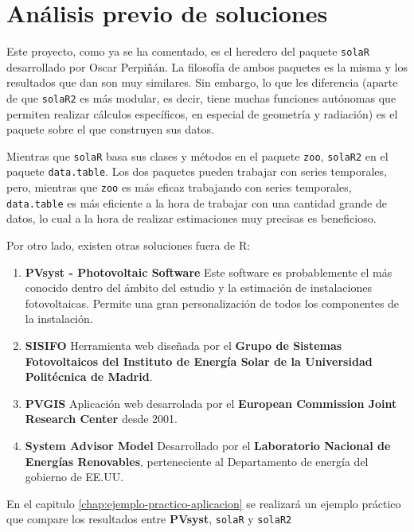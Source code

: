 \section{Análisis previo de soluciones}
\label{sec:org708989f}
Este proyecto, como ya se ha comentado, es el heredero del paquete \texttt{solaR} desarrollado por Oscar Perpiñán. La filosofía de ambos paquetes es la misma y los resultados que dan son muy similares. Sin embargo, lo que les diferencia (aparte de que \texttt{solaR2} es más modular, es decir, tiene muchas funciones autónomas que permiten realizar cálculos específicos, en especial de geometría y radiación) es el paquete sobre el que construyen sus datos.

Mientras que \texttt{solaR} basa sus clases y métodos en el paquete \texttt{zoo}, \texttt{solaR2} en el paquete \texttt{data.table}. Los dos paquetes pueden trabajar con series temporales, pero, mientras que \texttt{zoo} es más eficaz trabajando con series temporales, \texttt{data.table} es más eficiente a la hora de trabajar con una cantidad grande de datos, lo cual a la hora de realizar estimaciones muy precisas es beneficioso.

Por otro lado, existen otras soluciones fuera de R:
\begin{enumerate}
\item \textbf{PVsyst - Photovoltaic Software} \cite{pvsyst}
Este software es probablemente el más conocido dentro del ámbito del estudio y la estimación de instalaciones fotovoltaicas. Permite una gran personalización de todos los componentes de la instalación.
\item \textbf{SISIFO} \cite{sisifo}
Herramienta web diseñada por el \textbf{Grupo de Sistemas Fotovoltaicos del Instituto de Energía Solar de la Universidad Politécnica de Madrid}.
\item \textbf{PVGIS} \cite{pvgis}
Aplicación web desarrolada por el \textbf{European Commission Joint Research Center} desde 2001.
\item \textbf{System Advisor Model} \cite{sam}
Desarrollado por el \textbf{Laboratorio Nacional de Energías Renovables}, perteneciente al Departamento de energía del gobierno de EE.UU.
\end{enumerate}
En el capitulo \ref{chap:ejemplo-practico-aplicacion} se realizará un ejemplo práctico que compare los resultados entre \textbf{PVsyst}, \texttt{solaR} y \texttt{solaR2}
